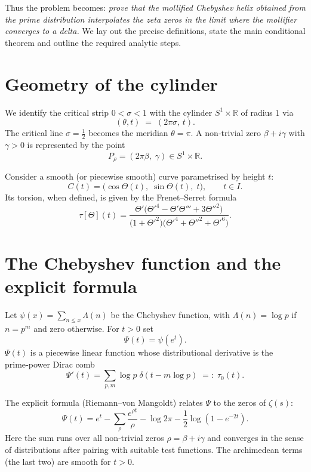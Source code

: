 \documentclass[12pt,a4paper]{article}
\newcommand{\R}{\mathbb{R}}
\begin{document}
Thus the problem becomes: \emph{prove that the mollified Chebyshev helix obtained from
the prime distribution interpolates the zeta zeros in the limit where the mollifier
converges to a delta.}  We lay out the precise definitions, state the main conditional
theorem and outline the required analytic steps.

\section{Geometry of the cylinder}

We identify the critical strip \(0<\sigma<1\) with the cylinder
\(S^1\times\R\) of radius \(1\) via
\[
(\theta, t) \;=\; (2\pi\sigma,\, t).
\]
The critical line \(\sigma=\frac12\) becomes the meridian \(\theta=\pi\).
A non‑trivial zero \(\beta+i\gamma\) with \(\gamma>0\) is represented by the point
\[
P_\rho = (2\pi\beta,\; \gamma)\in S^1\times\R .
\]

Consider a smooth (or piecewise smooth) curve parametrised by height \(t\):
\[
C(t) = \bigl( \cos\Theta(t),\; \sin\Theta(t),\; t \bigr),\qquad t\in I.
\]
Its torsion, when defined, is given by the Frenet–Serret formula
\begin{equation}\label{eq:torsion}
\tau[\Theta](t) =
\frac{\Theta'\bigl(\Theta'^4 - \Theta'\Theta''' + 3\Theta''^2\bigr)}
{\bigl(1+\Theta'^2\bigr)\bigl(\Theta'^4 + \Theta''^2 + \Theta'^6\bigr)} .
\end{equation}

\section{The Chebyshev function and the explicit formula}

Let \(\psi(x)=\sum_{n\le x}\Lambda(n)\) be the Chebyshev function, with
\(\Lambda(n)=\log p\) if \(n=p^m\) and zero otherwise.
For \(t>0\) set
\[
\Psi(t) = \psi(e^t).
\]
\(\Psi(t)\) is a piecewise linear function whose distributional derivative is the
prime‑power Dirac comb
\begin{equation}\label{eq:primedist}
\Psi'(t) = \sum_{p,m} \log p\; \delta(t - m\log p)
\;=:\;\tau_0(t).
\end{equation}

The explicit formula (Riemann–von Mangoldt) relates \(\Psi\) to the zeros of \(\zeta(s)\):
\begin{equation}\label{eq:explicit}
\Psi(t) = e^t - \sum_{\rho}\frac{e^{\rho t}}{\rho}
          - \log 2\pi - \frac12\log(1-e^{-2t}) .
\end{equation}
Here the sum runs over all non‑trivial zeros \(\rho=\beta+i\gamma\) and converges in
the sense of distributions after pairing with suitable test functions.  The
archimedean terms (the last two) are smooth for \(t>0\).
\end{document}
